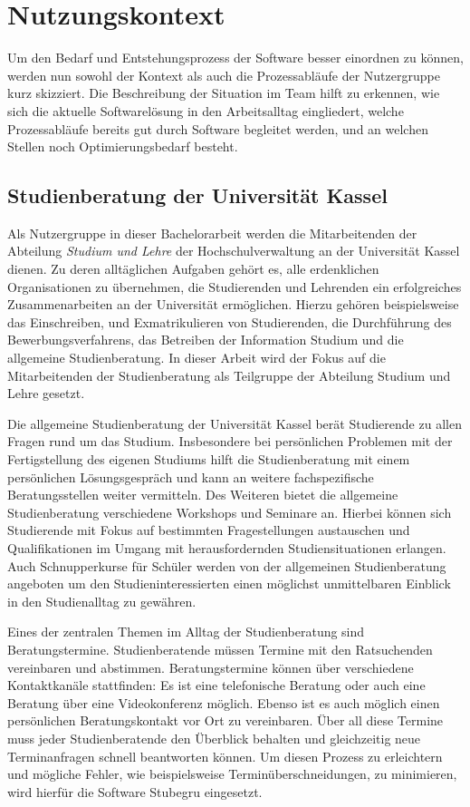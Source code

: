 \chapter{Nutzungskontext}
\label{chapter:user-context}

Um den Bedarf und Entstehungsprozess der Software besser einordnen zu können,
werden nun sowohl der Kontext als auch die Prozessabläufe der Nutzergruppe kurz
skizziert. Die Beschreibung der Situation im Team hilft zu erkennen, wie sich
die aktuelle Softwarelösung in den Arbeitsalltag eingliedert, welche
Prozessabläufe bereits gut durch Software begleitet werden, und an welchen
Stellen noch Optimierungsbedarf besteht.

\section{Studienberatung der Universität Kassel}
Als Nutzergruppe in dieser Bachelorarbeit werden die Mitarbeitenden der
Abteilung \textit{Studium und Lehre} der Hochschulverwaltung an der Universität
Kassel dienen. Zu deren alltäglichen Aufgaben gehört es, alle erdenklichen
Organisationen zu übernehmen, die Studierenden und Lehrenden ein erfolgreiches
Zusammenarbeiten an der Universität ermöglichen. Hierzu gehören beispielsweise
das Einschreiben, und Exmatrikulieren von Studierenden, die Durchführung des
Bewerbungsverfahrens, das Betreiben der Information Studium und die allgemeine
Studienberatung. In dieser Arbeit wird der Fokus auf die Mitarbeitenden der
Studienberatung als Teilgruppe der Abteilung Studium und Lehre gesetzt.

Die allgemeine Studienberatung der Universität Kassel berät Studierende zu
allen Fragen rund um das Studium. Insbesondere bei persönlichen Problemen mit
der Fertigstellung des eigenen Studiums hilft die Studienberatung mit einem
persönlichen Lösungsgespräch und kann an weitere fachspezifische
Beratungsstellen weiter vermitteln. Des Weiteren bietet die allgemeine
Studienberatung verschiedene Workshops und Seminare an. Hierbei können sich
Studierende mit Fokus auf bestimmten Fragestellungen austauschen und
Qualifikationen im Umgang mit herausfordernden Studiensituationen erlangen.
Auch Schnupperkurse für Schüler werden von der allgemeinen Studienberatung
angeboten um den Studieninteressierten einen möglichst unmittelbaren Einblick
in den Studienalltag zu gewähren\cite{studBeratungKsWeb}.

Eines der zentralen Themen im Alltag der Studienberatung sind Beratungstermine.
Studienberatende müssen Termine mit den Ratsuchenden vereinbaren und abstimmen.
Beratungstermine können über verschiedene Kontaktkanäle stattfinden: Es ist
eine telefonische Beratung oder auch eine Beratung über eine Videokonferenz
möglich. Ebenso ist es auch möglich einen persönlichen Beratungskontakt vor Ort
zu vereinbaren. Über all diese Termine muss jeder Studienberatende den
Überblick behalten und gleichzeitig neue Terminanfragen schnell beantworten
können. Um diesen Prozess zu erleichtern und mögliche Fehler, wie
beispielsweise Terminüberschneidungen, zu minimieren, wird hierfür die Software
\gls{Stubegru} eingesetzt.

